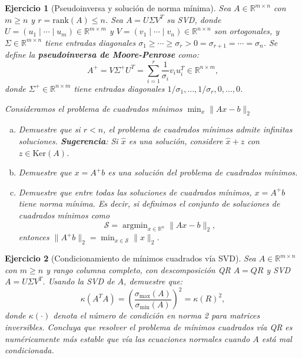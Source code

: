\documentclass[12pt]{article}
\newtheorem{exercise}{Ejercicio}
\begin{document}
\begin{exercise}[Pseudoinversa y solución de norma mínima]
Sea $A \in \mathbb{R}^{m \times n}$ con $m \geq n$ y $r = \text{rank}(A) \leq n$. Sea $A = U\Sigma V^T$ su SVD, donde $U = (u_1 \mid \cdots \mid u_m) \in \mathbb{R}^{m \times m}$ y $V = (v_1 \mid \cdots \mid v_n) \in \mathbb{R}^{n \times n}$ son ortogonales, y $\Sigma \in \mathbb{R}^{m \times n}$ tiene entradas diagonales $\sigma_1 \geq \cdots \geq \sigma_r > 0 = \sigma_{r+1} = \cdots = \sigma_n$. Se define la \textbf{pseudoinversa de Moore-Penrose} como:
\[
A^+ = V\Sigma^+ U^T = \sum_{i=1}^r \frac{1}{\sigma_i} v_i u_i^T \in \mathbb{R}^{n \times m},
\]
donde $\Sigma^+ \in \mathbb{R}^{n \times m}$ tiene entradas diagonales $1/\sigma_1, \ldots, 1/\sigma_r, 0, \ldots, 0$.

Consideramos el problema de cuadrados mínimos $\min_x \|Ax - b\|_2$
\begin{enumerate}[(a)]
\item Demuestre que si $r < n$, el problema de cuadrados mínimos admite infinitas soluciones.
\textbf{Sugerencia}: Si $\hat{x}$ es una solución, considere $\hat{x} + z$ con $z \in \text{Ker}(A)$.
\item Demuestre que $x = A^+ b$ es una solución del problema de cuadrados mínimos.
\item Demuestre que entre todas las soluciones de cuadrados mínimos, $x = A^+b$ tiene norma mínima. Es decir, si definimos el conjunto de soluciones de cuadrados mínimos como
\[
\mathcal{S} = \operatorname{argmin}_{x \in \mathbb{R}^n} \|Ax - b\|_2,
\]
entonces $\|A^+b\|_2 = \min_{x \in \mathcal{S}} \|x\|_2$.
\end{enumerate}
\end{exercise}



\begin{exercise}[Condicionamiento de mínimos cuadrados vía SVD]
Sea $A \in \mathbb{R}^{m \times n}$ con $m \geq n$ y rango columna completo, con descomposición QR $A = QR$ y SVD $A = U\Sigma V^T$.
Usando la SVD de $A$, demuestre que:
\[
\kappa(A^TA) = \left(\frac{\sigma_{\max}(A)}{\sigma_{\min}(A)}\right)^2 = \kappa(R)^2,
\]
donde $\kappa(\cdot)$ denota el número de condición en norma 2 para matrices inversibles. Concluya que resolver el problema de mínimos cuadrados vía QR es numéricamente más estable que vía las ecuaciones normales cuando $A$ está mal condicionada.
\end{exercise}


\end{document}
